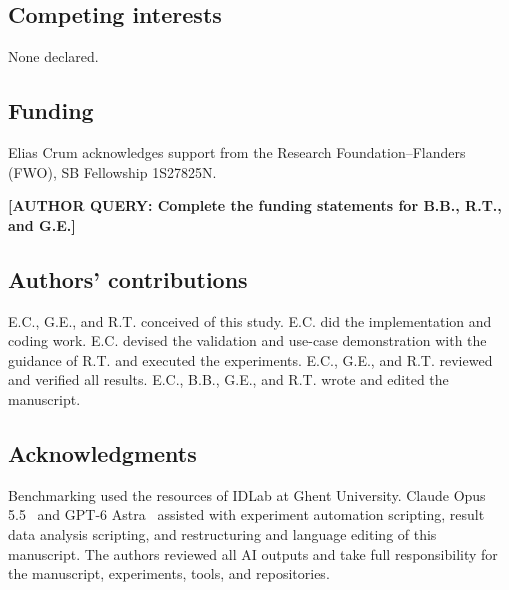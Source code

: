 \documentclass[pdflatex,sn-mathphys-num]{sn-jnl}
\newcommand{\authorquery}[1]{\par\smallskip\noindent\begin{minipage}{\linewidth}\color{queryorange}\textbf{[AUTHOR QUERY: #1]}\end{minipage}\par\smallskip}
\begin{document}
\subsection*{Competing interests}
None declared.

\subsection*{Funding}
Elias Crum acknowledges support from the Research Foundation--Flanders (FWO), SB Fellowship 1S27825N.
\authorquery{Complete the funding statements for B.B., R.T., and G.E.}

\subsection*{Authors' contributions}
E.C., G.E., and R.T. conceived of this study.
E.C. did the implementation and coding work.
E.C. devised the validation and use-case demonstration with the guidance of R.T. and executed the experiments.
E.C., G.E., and R.T. reviewed and verified all results.
E.C., B.B., G.E., and R.T. wrote and edited the manuscript.

\subsection*{Acknowledgments}
Benchmarking used the resources of IDLab at Ghent University.
Claude Opus 5.5~\cite{anthropic2026claudeopus55} and GPT-6 Astra~\cite{openai2026gpt6astra} assisted with experiment automation scripting, result data analysis scripting, and restructuring and language editing of this manuscript.
The authors reviewed all AI outputs and take full responsibility for the manuscript, experiments, tools, and repositories.

\clearpage

\end{document}
